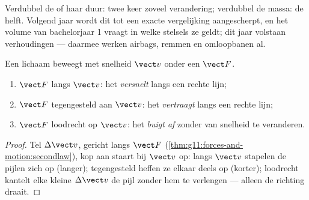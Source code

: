 \begin{remark}
Verdubbel de  of haar duur: twee keer zoveel verandering;
verdubbel de massa: de helft. Volgend jaar wordt dit tot een exacte
vergelijking aangescherpt, en het volume van bachelorjaar 1 vraagt in
welke stelsels ze geldt; dit jaar volstaan verhoudingen --- daarmee
werken airbags, remmen en omloopbanen al.
\end{remark}

\begin{proposition}\label{prop:g11:forces-and-motion:cases}
Een lichaam beweegt met snelheid $\vect v$ onder een  $\vect F$.
\begin{enumerate}
  \item $\vect F$ langs $\vect v$: het \emph{versnelt} langs een rechte
        lijn;
  \item $\vect F$ tegengesteld aan $\vect v$: het \emph{vertraagt} langs
        een rechte lijn;
  \item $\vect F$ loodrecht op $\vect v$: het \emph{buigt af} zonder van
        snelheid te veranderen.
\end{enumerate}
\end{proposition}

\begin{proof}
Tel $\Delta\vect v$, gericht langs $\vect F$
(\cref{thm:g11:forces-and-motion:secondlaw}), kop aan staart bij
$\vect v$ op: langs $\vect v$ stapelen de pijlen zich op (langer);
tegengesteld heffen ze elkaar deels op (korter); loodrecht kantelt elke
kleine $\Delta \vect v$ de pijl zonder hem te verlengen --- alleen de
richting draait.
\end{proof}

